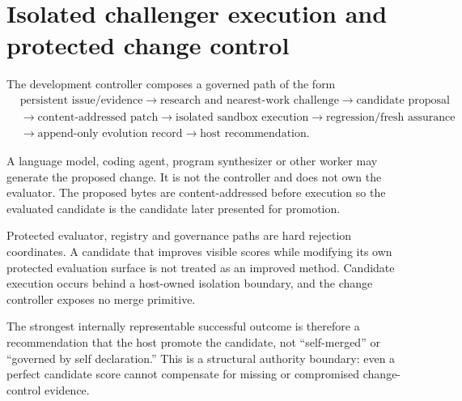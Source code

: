 \section{Isolated challenger execution and protected change control}

The development controller composes a governed path of the form
\[
\begin{aligned}
&\text{persistent issue/evidence}
\rightarrow \text{research and nearest-work challenge}
\rightarrow \text{candidate proposal}\\
&\rightarrow \text{content-addressed patch}
\rightarrow \text{isolated sandbox execution}
\rightarrow \text{regression/fresh assurance}\\
&\rightarrow \text{append-only evolution record}
\rightarrow \text{host recommendation}.
\end{aligned}
\]

A language model, coding agent, program synthesizer or other worker may generate the proposed change. It is not the controller and does not own the evaluator. The proposed bytes are content-addressed before execution so the evaluated candidate is the candidate later presented for promotion.

Protected evaluator, registry and governance paths are hard rejection coordinates. A candidate that improves visible scores while modifying its own protected evaluation surface is not treated as an improved method. Candidate execution occurs behind a host-owned isolation boundary, and the change controller exposes no merge primitive.

The strongest internally representable successful outcome is therefore a recommendation that the host promote the candidate, not ``self-merged'' or ``governed by self declaration.'' This is a structural authority boundary: even a perfect candidate score cannot compensate for missing or compromised change-control evidence.
